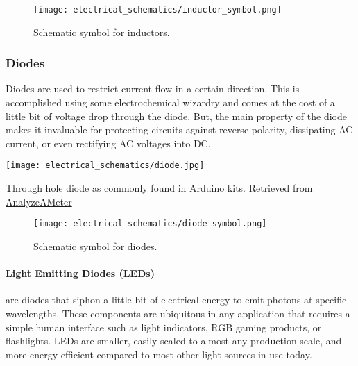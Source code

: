 
        \begin{figure}[h!]
            \texttt{[image: electrical\_schematics/inductor\_symbol.png]}
            \caption[Inductor Symbol]{Schematic symbol for inductors.}
        \end{figure}

        \subsubsection*{Diodes}
        Diodes are used to restrict current flow in a certain direction.
        This is accomplished using some electrochemical wizardry and comes at the cost of a little bit of voltage drop through the diode.
        But, the main property of the diode makes it invaluable for protecting circuits against reverse polarity, dissipating AC current, or even rectifying AC voltages into DC.

        \begin{marginfigure}[-1in]
            \texttt{[image: electrical\_schematics/diode.jpg]}
            \caption{Through hole diode as commonly found in Arduino kits.
            Retrieved from \href{https://analyseameter.com/2016/03/diodes-types-operation-symbol-applications.html}{AnalyzeAMeter}}
        \end{marginfigure}

        \begin{figure}[h!]
            \texttt{[image: electrical\_schematics/diode\_symbol.png]}
            \caption[Diode Symbol]{Schematic symbol for diodes.}
        \end{figure}

        \paragraph*{Light Emitting Diodes (LEDs)} are diodes that siphon a little bit of electrical energy to emit photons at specific wavelengths.
        These components are ubiquitous in any application that requires a simple human interface such as light indicators, RGB gaming products, or flashlights.
        LEDs are smaller, easily scaled to almost any production scale, and more energy efficient compared to most other light sources in use today.


